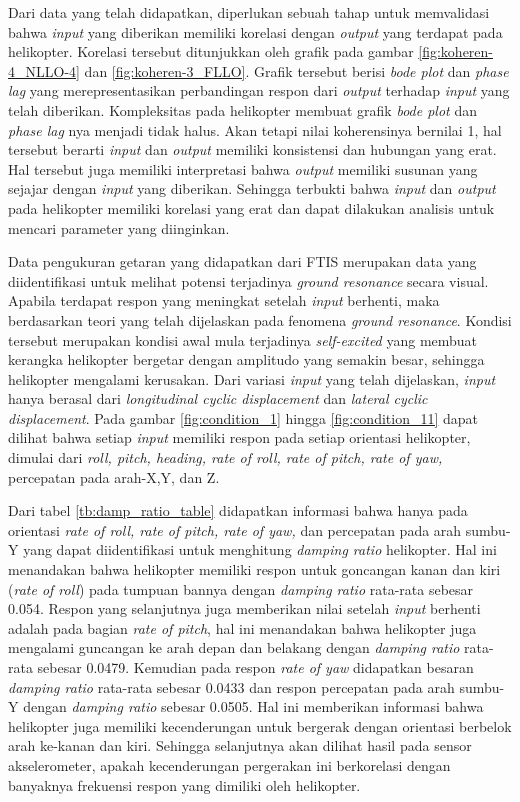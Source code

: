 Dari data yang telah didapatkan, diperlukan sebuah tahap untuk memvalidasi bahwa \textit{input} yang diberikan memiliki korelasi dengan \textit{output} yang terdapat pada helikopter. Korelasi tersebut ditunjukkan oleh grafik pada gambar \ref{fig:koheren-4_NLLO-4} dan \ref{fig:koheren-3_FLLO}. Grafik tersebut berisi \textit{bode plot} dan \textit{phase lag} yang merepresentasikan perbandingan respon dari \textit{output} terhadap \textit{input} yang telah diberikan. Kompleksitas pada helikopter membuat grafik \textit{bode plot} dan \textit{phase lag} nya menjadi tidak halus. Akan tetapi nilai koherensinya bernilai 1, hal tersebut berarti \textit{input} dan \textit{output} memiliki konsistensi dan hubungan yang erat. Hal tersebut juga memiliki interpretasi bahwa \textit{output} memiliki susunan yang sejajar dengan \textit{input} yang diberikan. Sehingga terbukti bahwa \textit{input} dan \textit{output} pada helikopter memiliki korelasi yang erat dan dapat dilakukan analisis untuk mencari parameter yang diinginkan.

Data pengukuran getaran yang didapatkan dari FTIS merupakan data yang diidentifikasi untuk melihat potensi terjadinya \textit{ground resonance} secara visual. Apabila terdapat respon yang meningkat setelah \textit{input} berhenti, maka berdasarkan teori yang telah dijelaskan pada fenomena \textit{ground resonance}. Kondisi tersebut merupakan kondisi awal mula terjadinya \textit{self-excited} yang membuat kerangka helikopter bergetar dengan amplitudo yang semakin besar, sehingga helikopter mengalami kerusakan. Dari variasi \textit{input} yang telah dijelaskan, \textit{input} hanya berasal dari \textit{longitudinal cyclic displacement} dan \textit{lateral cyclic displacement}. Pada gambar \ref{fig:condition_1} hingga \ref{fig:condition_11} dapat dilihat bahwa setiap \textit{input} memiliki respon pada setiap orientasi helikopter, dimulai dari \textit{roll, pitch, heading, rate of roll, rate of pitch, rate of yaw,} percepatan pada arah-X,Y, dan Z. 

Dari tabel \ref{tb:damp_ratio_table} didapatkan informasi bahwa hanya pada orientasi \textit{rate of roll, rate of pitch, rate of yaw,} dan percepatan pada arah sumbu-Y yang dapat diidentifikasi untuk menghitung \textit{damping ratio} helikopter. Hal ini menandakan bahwa helikopter memiliki respon untuk goncangan kanan dan kiri (\textit{rate of roll}) pada tumpuan bannya dengan \textit{damping ratio} rata-rata sebesar 0.054. Respon yang selanjutnya juga memberikan nilai setelah \textit{input} berhenti adalah pada bagian \textit{rate of pitch}, hal ini menandakan bahwa helikopter juga mengalami guncangan ke arah depan dan belakang dengan \textit{damping ratio} rata-rata sebesar 0.0479. Kemudian pada respon \textit{rate of yaw} didapatkan besaran \textit{damping ratio} rata-rata sebesar 0.0433 dan respon percepatan pada arah sumbu-Y dengan \textit{damping ratio} sebesar 0.0505. Hal ini memberikan informasi bahwa helikopter juga memiliki kecenderungan untuk bergerak dengan orientasi berbelok arah ke-kanan dan kiri. Sehingga selanjutnya akan dilihat hasil pada sensor akselerometer, apakah kecenderungan pergerakan ini berkorelasi dengan banyaknya frekuensi respon yang dimiliki oleh helikopter.

